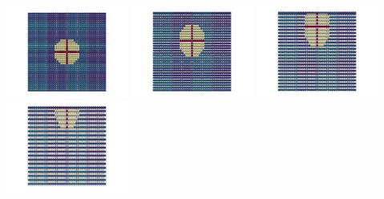 \begin{center}
\includegraphics[width=4cm]{python_codes/fieldstone_89/results/vertical/paint0000}
\includegraphics[width=4cm]{python_codes/fieldstone_89/results/vertical/paint0005}
\includegraphics[width=4cm]{python_codes/fieldstone_89/results/vertical/paint0010}
\includegraphics[width=4cm]{python_codes/fieldstone_89/results/vertical/paint0015}
\end{center}

